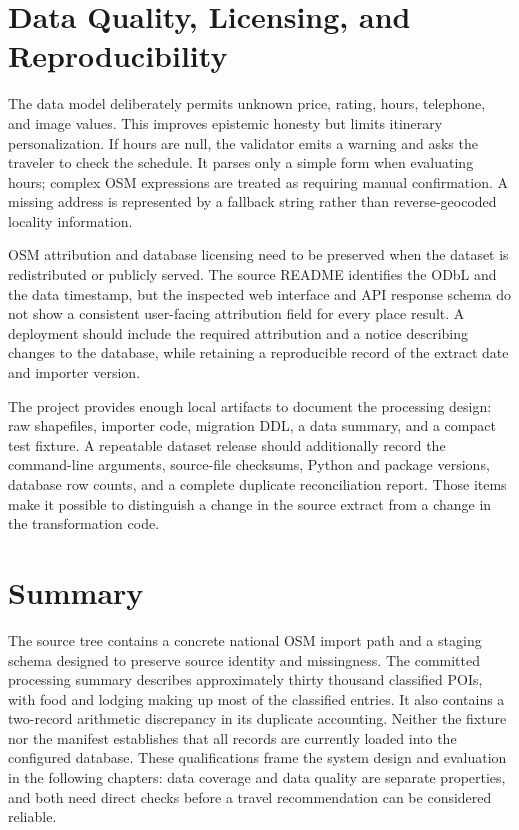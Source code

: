 \section{Data Quality, Licensing, and Reproducibility}

The data model deliberately permits unknown price, rating, hours, telephone, and image values. This improves epistemic honesty but limits itinerary personalization. If hours are null, the validator emits a warning and asks the traveler to check the schedule. It parses only a simple  form when evaluating hours; complex OSM expressions are treated as requiring manual confirmation. A missing address is represented by a fallback string rather than reverse-geocoded locality information.

OSM attribution and database licensing need to be preserved when the dataset is redistributed or publicly served. The source README identifies the ODbL and the data timestamp, but the inspected web interface and API response schema do not show a consistent user-facing attribution field for every place result. A deployment should include the required attribution and a notice describing changes to the database, while retaining a reproducible record of the extract date and importer version.

The project provides enough local artifacts to document the processing design: raw shapefiles, importer code, migration DDL, a data summary, and a compact test fixture. A repeatable dataset release should additionally record the command-line arguments, source-file checksums, Python and package versions, database row counts, and a complete duplicate reconciliation report. Those items make it possible to distinguish a change in the source extract from a change in the transformation code.

\section{Summary}

The source tree contains a concrete national OSM import path and a staging schema designed to preserve source identity and missingness. The committed processing summary describes approximately thirty thousand classified POIs, with food and lodging making up most of the classified entries. It also contains a two-record arithmetic discrepancy in its duplicate accounting. Neither the fixture nor the manifest establishes that all records are currently loaded into the configured database. These qualifications frame the system design and evaluation in the following chapters: data coverage and data quality are separate properties, and both need direct checks before a travel recommendation can be considered reliable.
